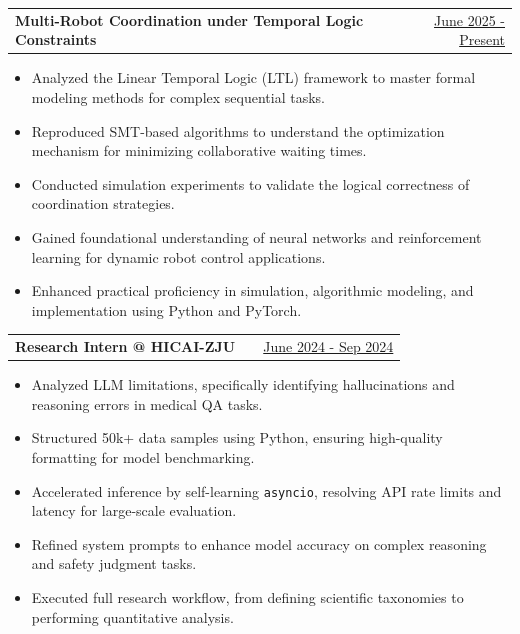 \documentclass[a4paper,12pt]{article}
\makeatletter
\newenvironment{joblong}[2]
    {
    \begin{tabularx}{\linewidth}{@{}l X r@{}}
    \textbf{#1} & \hfill &  #2 \\[3.75pt]
    \end{tabularx}
    \begin{minipage}[t]{\linewidth}
    \begin{itemize}[nosep,after=\strut, leftmargin=1em, itemsep=3pt,label=--]
    }
    {
    \end{itemize}
    \end{minipage}    
    }
\makeatother
\begin{document}
\begin{joblong}{Multi-Robot Coordination under Temporal Logic Constraints}{\href{https://vamperd.github.io/research/}{June 2025 - Present}}
\item Analyzed the Linear Temporal Logic (LTL) framework to master formal modeling methods for complex sequential tasks.
\item Reproduced SMT-based algorithms to understand the optimization mechanism for minimizing collaborative waiting times.
\item Conducted simulation experiments to validate the logical correctness of coordination strategies.
\item Gained foundational understanding of neural networks and reinforcement learning for dynamic robot control applications.
\item Enhanced practical proficiency in simulation, algorithmic modeling, and implementation using Python and PyTorch.
\end{joblong}

\begin{joblong}{Research Intern @ HICAI-ZJU}{\href{https://github.com/HICAI-ZJU/SciKnowEval}{June 2024 - Sep 2024}}
\item Analyzed LLM limitations, specifically identifying hallucinations and reasoning errors in medical QA tasks.
\item Structured 50k+ data samples using Python, ensuring high-quality formatting for model benchmarking.
\item Accelerated inference by self-learning \texttt{asyncio}, resolving API rate limits and latency for large-scale evaluation.
\item Refined system prompts to enhance model accuracy on complex reasoning and safety judgment tasks.
\item Executed full research workflow, from defining scientific taxonomies to performing quantitative analysis.
\end{joblong}
  
\end{document}

